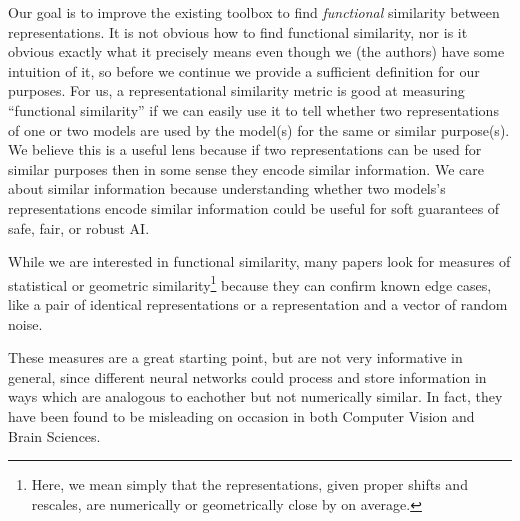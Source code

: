 \documentclass{article}
\begin{document}
Our goal is to improve the existing toolbox to find \textit{functional} similarity between representations.
It is not obvious how to find functional similarity, nor is it obvious exactly what it precisely
means even though we (the authors) have some intuition of it, so before we continue we provide
a sufficient definition for our purposes. For us, a representational similarity metric
is good at measuring ``functional similarity'' if we can easily use it to tell whether two
representations of one or two models are used by the model(s) for the same or similar purpose(s).
We believe this is a useful lens because if two representations can be used for similar purposes
then in some sense they encode similar information. We care about similar information
because understanding whether two models's representations
encode similar information could be useful for soft guarantees of safe, fair, or robust AI.

While we are interested in functional similarity, many papers \cite{Kornblith2019SimilarityON} 
\cite{Morcos2018InsightsOR} \cite{Ding2021GroundingRS}
look for measures of statistical or geometric similarity\footnote{
  Here, we mean simply that the representations, given proper shifts and rescales,
  are numerically or geometrically close by on average.
} because they can confirm known edge cases, like
a pair of identical representations or a representation and a vector of random noise.

These measures are a great starting point, but are not very informative in general, since different
neural networks could process and store information in ways which are analogous to eachother but not numerically
similar. In fact, they have been found \cite{Ding2021GroundingRS} \cite{Dujmovi2022SomePO} to be misleading on occasion
in both Computer Vision and Brain Sciences.
\end{document}
